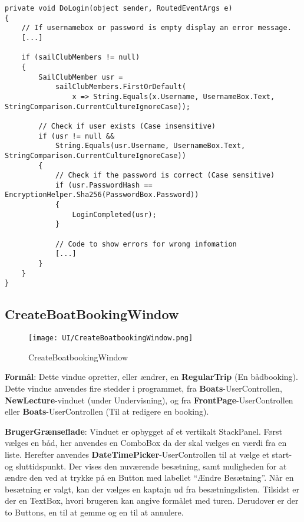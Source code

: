 \begin{lstlisting}[frame=single, caption=DoLogin, label=dologin]
private void DoLogin(object sender, RoutedEventArgs e)
{
    // If usernamebox or password is empty display an error message.
    [...]
 
    if (sailClubMembers != null)
    {
        SailClubMember usr =
            sailClubMembers.FirstOrDefault(
                x => String.Equals(x.Username, UsernameBox.Text, StringComparison.CurrentCultureIgnoreCase));
 
        // Check if user exists (Case insensitive)
        if (usr != null &&
            String.Equals(usr.Username, UsernameBox.Text, StringComparison.CurrentCultureIgnoreCase))
        {
            // Check if the password is correct (Case sensitive)
            if (usr.PasswordHash == EncryptionHelper.Sha256(PasswordBox.Password))
            {
                LoginCompleted(usr);
            } 
 
            // Code to show errors for wrong infomation
            [...]
        }
    }
}
\end{lstlisting}


\subsection{CreateBoatBookingWindow}

\begin{wrapfigure}{R}{0.5\textwidth}
    \label{img:boatBookWindow}
    \vspace{-20pt}
    \begin{center}
        \texttt{[image: UI/CreateBoatbookingWindow.png]}
    \end{center}
    \vspace{-20pt}
    \caption{CreateBoatbookingWindow}
    \vspace{-30pt}
\end{wrapfigure}

\textbf{Formål}: 
Dette vindue opretter, eller ændrer, en \textbf{RegularTrip} (En bådbooking).
Dette vindue anvendes fire stedder i programmet, fra \textbf{Boats}-UserControllen, \textbf{NewLecture}-vinduet (under Undervisning), og fra \textbf{FrontPage}-UserControllen eller \textbf{Boats}-UserControllen (Til at redigere en booking). 

\textbf{BrugerGrænseflade}: 
Vinduet er opbygget af et vertikalt StackPanel.
Først vælges en båd, her anvendes en ComboBox da der skal vælges en værdi fra en liste.
Herefter anvendes \textbf{DateTimePicker}-UserControllen til at vælge et start- og sluttidspunkt.
Der vises den nuværende besætning, samt muligheden for at ændre den ved at trykke på en Button med labellet ``Ændre Besætning''.
Når en besætning er valgt, kan der vælges en kaptajn ud fra besætningslisten.
Tilsidst er der en TextBox, hvori brugeren kan angive formålet med turen.
Derudover er der to Buttons, en til at gemme og en til at annulere.

